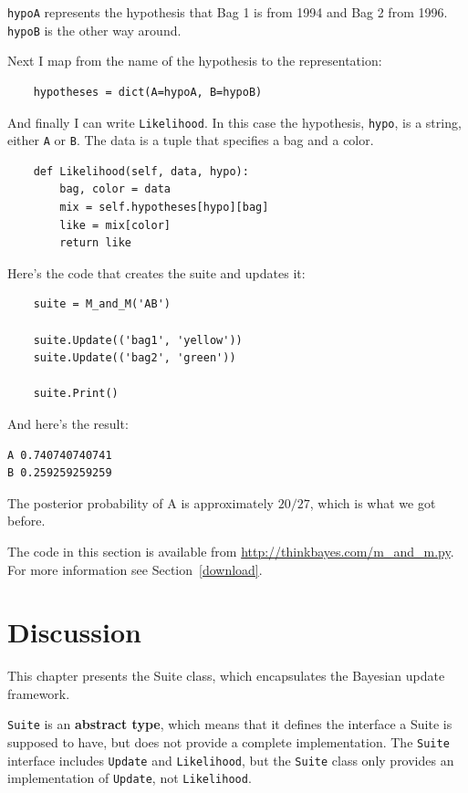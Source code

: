 \documentclass[12pt]{book}
\begin{document}
\verb"hypoA" represents the hypothesis that Bag 1 is from
1994 and Bag 2 from 1996.  \verb"hypoB" is the other way
around.

Next I map from the name of the hypothesis to the representation:

\begin{verbatim}
    hypotheses = dict(A=hypoA, B=hypoB)
\end{verbatim}

And finally I can write \verb"Likelihood".  In this case
the hypothesis, \verb"hypo", is a string, either \verb"A" or \verb"B".
The data is a tuple that specifies a bag
and a color.

\begin{verbatim}
    def Likelihood(self, data, hypo):
        bag, color = data
        mix = self.hypotheses[hypo][bag]
        like = mix[color]
        return like
\end{verbatim}

Here's the code that creates the suite and updates it:

\begin{verbatim}
    suite = M_and_M('AB')

    suite.Update(('bag1', 'yellow'))
    suite.Update(('bag2', 'green'))

    suite.Print()
\end{verbatim}

And here's the result:

\begin{verbatim}
A 0.740740740741
B 0.259259259259
\end{verbatim}

The posterior probability of A is approximately $20/27$, which is what
we got before.

The code in this section is available from
\url{http://thinkbayes.com/m_and_m.py}.  For more information see
Section~\ref{download}.

\section{Discussion}

This chapter presents the Suite class, which encapsulates the 
Bayesian update framework.

{\tt Suite} is an {\bf abstract type}, which means that it defines the
interface a Suite is supposed to have, but does not provide a complete
implementation.  The {\tt Suite} interface includes {\tt Update} and
{\tt Likelihood}, but the {\tt Suite} class only provides an
implementation of {\tt Update}, not {\tt Likelihood}.
  
\end{document}
